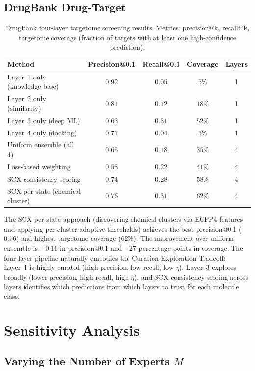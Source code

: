 \documentclass[11pt]{article}
\begin{document}
\subsection{DrugBank Drug-Target}

\begin{table}[h]
\centering
\caption{DrugBank four-layer targetome screening results. Metrics: precision@k, recall@k, targetome coverage (fraction of targets with at least one high-confidence prediction).}
\label{tab:drugbank_full}
\begin{tabular}{lcccc}
\hline
Method & Precision@0.1 & Recall@0.1 & Coverage & Layers \\
\hline
Layer~1 only (knowledge base) & $0.92$ & $0.05$ & $5\%$ & 1 \\
Layer~2 only (similarity) & $0.81$ & $0.12$ & $18\%$ & 1 \\
Layer~3 only (deep ML) & $0.63$ & $0.31$ & $52\%$ & 1 \\
Layer~4 only (docking) & $0.71$ & $0.04$ & $3\%$ & 1 \\
\hline
Uniform ensemble (all 4) & $0.65$ & $0.18$ & $35\%$ & 4 \\
Loss-based weighting & $0.58$ & $0.22$ & $41\%$ & 4 \\
SCX consistency scoring & $0.74$ & $0.28$ & $58\%$ & 4 \\
\hline
SCX per-state (chemical cluster) & $0.76$ & $0.31$ & $62\%$ & 4 \\
\end{tabular}
\end{table}

The SCX per-state approach (discovering chemical clusters via ECFP4 features and applying per-cluster adaptive thresholds) achieves the best precision@0.1 ($0.76$) and highest targetome coverage ($62\%$). The improvement over uniform ensemble is $+0.11$ in precision@0.1 and $+27$ percentage points in coverage. The four-layer pipeline naturally embodies the Curation-Exploration Tradeoff: Layer~1 is highly curated (high precision, low recall, low $\eta$), Layer~3 explores broadly (lower precision, high recall, high $\eta$), and SCX consistency scoring across layers identifies which predictions from which layers to trust for each molecule class.

\section{Sensitivity Analysis}

\subsection{Varying the Number of Experts $M$}
\end{document}
